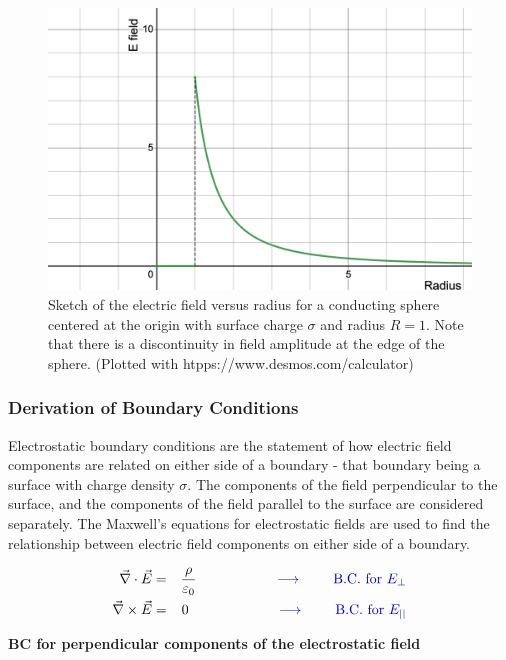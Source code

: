 \documentclass[12pt]{article}
\begin{document}
\begin{flushleft}
\begin{figure}[h]
\centering
\includegraphics*[trim=2cm 0cm 0cm 0cm, clip=true, width=0.5\columnwidth]{Esphere_surface.png}
\caption{Sketch of the electric field versus radius for a conducting sphere centered at the origin with surface charge $\sigma$ and radius $R=1$.  Note that there is a discontinuity in field amplitude at the edge of the sphere.  (Plotted with htpps://www.desmos.com/calculator)}
\label{fig:surfacecharge}
\end{figure}

\subsubsection*{\bf Derivation of Boundary Conditions}

Electrostatic boundary conditions are the statement of how electric field components are related on either side of a boundary - that boundary being a surface with charge density $\sigma$.  The components of the field perpendicular to the surface, and the components of the field parallel to the surface are considered separately.  The Maxwell's equations for electrostatic fields are used to find the relationship between electric field components on either side of a boundary.

\begin{eqnarray}
\vec{\nabla} \cdot \vec{E} & = & \frac{\rho}{\varepsilon_{0}} \hspace{.8in}  {\color{myblue} \longrightarrow \hspace{.3in} \mbox{B.C. for $E_{\perp}$}} 
\label{eq:dive}\\
\vec{\nabla} \times \vec{E} &  = & 0 \hspace{.9in}  {\color{myblue} \longrightarrow \hspace{.3in} \mbox{B.C. for $E_{||}$}}
\label{eq:curle}
\end{eqnarray}

\vspace{.2in}
{\bf \color{myblue} BC for perpendicular components of the electrostatic field}


\end{flushleft}
\end{document}
